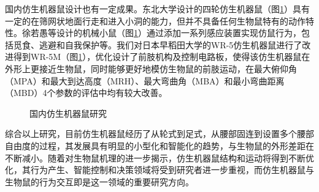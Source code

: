 国内仿生机器鼠设计也有一定成果。东北大学设计的四轮仿生机器鼠（图\ref{figure_cn}）具有一定的在筛网状地面行走和进入小洞的能力，但并不具备任何生物鼠特有的动作特性\cite{guoFangShengShuJiJieXiTongSheJiYuYunDongTeXingYanJiu2010}。徐若愚等设计的机械小鼠（图\ref{figure_cn}）通过添加一系列感应装置实现仿鼠行为，包括觅食、逃避和自我保护等\cite{xuFangShengJiJieXiaoShuDeYanJiuJiSheJi2016}。我们对日本早稻田大学的WR-5仿生机器鼠进行了改进得到WR-5M（图\ref{figure_cn}），优化设计了前肢机构及控制电路板，使得该仿生机器鼠在外形上更接近生物鼠，同时能够更好地模仿生物鼠的前肢运动，在最大俯仰角（MPA）和最大到达高度（MRH）、最大弯曲角（MBA）和最小弯曲距离（MBD）4个参数的评估中均有较大改善\cite{liJiQiShuDeFangShuYunDongChengDuPingGu2017a}。
\begin{figure}[htbp]
  \centering
  \caption{国内仿生机器鼠研究} \label{figure_cn}
\end{figure}

综合以上研究，目前仿生机器鼠经历了从轮式到足式，从腰部固连到设置多个腰部自由度的过程，其发展具有明显的小型化和智能化的趋势，与生物鼠的外形差距在不断减小。随着对生物鼠机理的进一步揭示，仿生机器鼠结构和运动将得到不断优化，其行为产生、智能控制和决策领域将受到研究者进一步重视，而仿生机器鼠与生物鼠的行为交互即是这一领域的重要研究方向。

